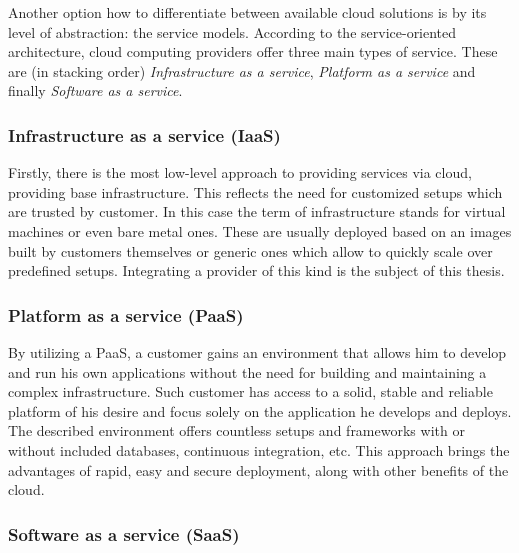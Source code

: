Another option how to differentiate between available cloud solutions is by its level of abstraction: the service models. According to the service-oriented architecture, cloud computing providers offer three main types of service. These are (in stacking order) \emph{Infrastructure as a service}, \emph{Platform as a service} and finally \emph{Software as a service}.

\subsubsection{Infrastructure as a service (IaaS)}
\label{subs:Infrastructure as a service (IaaS)}

Firstly, there is the most low-level approach to providing services via cloud, providing base infrastructure. This reflects the need for customized setups which are trusted by customer. In this case the term of infrastructure stands for virtual machines or even bare metal ones. These are usually deployed based on an images built by customers themselves or generic ones which allow to quickly scale over predefined setups. Integrating a provider of this kind is the subject of this thesis.

\subsubsection{Platform as a service (PaaS)}
\label{subs:Platform as a service (PaaS)}

By utilizing a PaaS, a customer gains an environment that allows him to develop and run his own applications without the need for building and maintaining a complex infrastructure. Such customer has access to a solid, stable and reliable platform of his desire and focus solely on the application he develops and deploys. The described environment offers countless setups and frameworks with or without included databases, continuous integration, etc. This approach brings the advantages of rapid, easy and secure deployment, along with other benefits of the cloud.

\subsubsection{Software as a service (SaaS)}
\label{subs:Software as a service (SaaS)}

